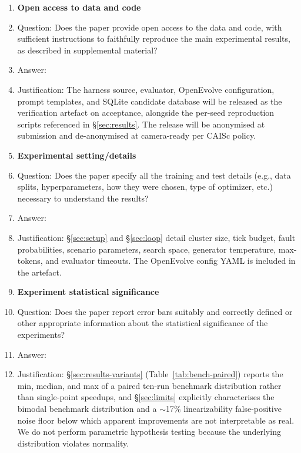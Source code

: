 \documentclass{article}
\begin{document}
\begin{enumerate}
\item {\bf Open access to data and code}
    \item[] Question: Does the paper provide open access to the data and code, with sufficient instructions to faithfully reproduce the main experimental results, as described in supplemental material?
    \item[] Answer: \answerYes{}
    \item[] Justification: The harness source, evaluator, OpenEvolve configuration, prompt templates, and SQLite candidate database will be released as the verification artefact on acceptance, alongside the per-seed reproduction scripts referenced in \S\ref{sec:results}. The release will be anonymised at submission and de-anonymised at camera-ready per CAISc policy.

\item {\bf Experimental setting/details}
    \item[] Question: Does the paper specify all the training and test details (e.g., data splits, hyperparameters, how they were chosen, type of optimizer, etc.) necessary to understand the results?
    \item[] Answer: \answerYes{}
    \item[] Justification: \S\ref{sec:setup} and \S\ref{sec:loop} detail cluster size, tick budget, fault probabilities, scenario parameters, search space, generator temperature, max-tokens, and evaluator timeouts. The OpenEvolve config YAML is included in the artefact.

\item {\bf Experiment statistical significance}
    \item[] Question: Does the paper report error bars suitably and correctly defined or other appropriate information about the statistical significance of the experiments?
    \item[] Answer: \answerYes{}
    \item[] Justification: \S\ref{sec:results-variants} (Table~\ref{tab:bench-paired}) reports the min, median, and max of a paired ten-run benchmark distribution rather than single-point speedups, and \S\ref{sec:limits} explicitly characterises the bimodal benchmark distribution and a $\sim$17\% linearizability false-positive noise floor below which apparent improvements are not interpretable as real. We do not perform parametric hypothesis testing because the underlying distribution violates normality.


\end{enumerate}
\end{document}
